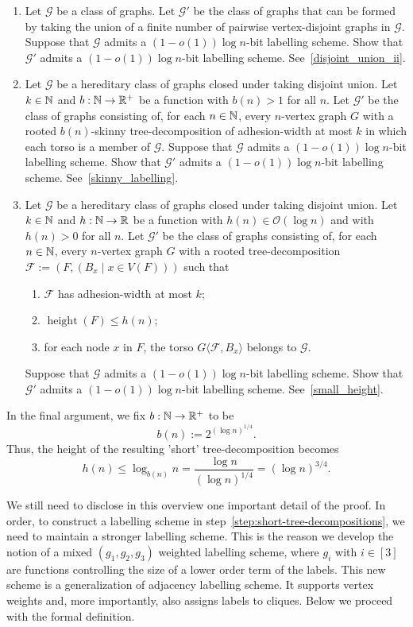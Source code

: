 \documentclass{patmorin}
\renewcommand{\le}{\leqslant}
\renewcommand{\leq}{\leqslant}
\newcommand{\torso}[2]{{#1}\langle{#2}\rangle}
\DeclareMathOperator{\height}{height}
\newcommand{\Oh}{\calO}
\newcommand{\calF}{\mathcal{F}}
\newcommand{\calG}{\mathcal{G}}
\newcommand{\calO}{\mathcal{O}}
\begin{document}
\begin{enumerate}[label=\rm(2\alph*)]
\item \label{step:union-closed}
Let $\calG$ be a class of graphs.
Let $\calG'$ be the class of graphs that can be formed by taking the union of a finite number of pairwise vertex-disjoint graphs in $\calG$.
    Suppose that $\calG$ admits a $(1-o(1))\log n$-bit labelling scheme.
    Show that $\calG'$ admits a $(1-o(1))\log n$-bit labelling scheme. See~\cref{disjoint_union_ii}.
\item \label{step:skinny-tree-decomposition}
Let $\calG$ be a hereditary class of graphs closed under taking disjoint union.
    Let $k\in\mathbb{N}$ and $b:\mathbb{N}\to\mathbb{R}^+$ be a function with $b(n)>1$ for all $n$.
    Let $\calG'$ be the class of graphs consisting of, for each $n\in\mathbb{N}$, every $n$-vertex graph $G$ with a rooted $b(n)$-skinny tree-decomposition of adhesion-width at most $k$ in which each torso is a member of $\calG$.
    Suppose that $\calG$ admits a $(1-o(1))\log n$-bit labelling scheme.
    Show that $\calG'$ admits a $(1-o(1))\log n$-bit labelling scheme. See~\cref{skinny_labelling}.
\item \label{step:short-tree-decompositions}
Let $\calG$ be a hereditary class of graphs closed under taking disjoint union. 
Let $k\in\mathbb{N}$ and  $h:\mathbb{N}\to\mathbb{R}$ be a function with $h(n)\in \Oh(\log n)$ and with $h(n)>0$ for all $n$. 
Let $\calG'$ be the class of graphs consisting of, for each $n\in\mathbb{N}$, every $n$-vertex graph $G$ with a rooted tree-decomposition $\calF:=(F,(B_x \mid x\in V(F)))$ such that
    \begin{enumerate}[nosep,nolistsep,label=(\rm{\roman*)}]
      \item $\calF$ has adhesion-width at most $k$;
      \item $\height(F)\le h(n)$;
      \item for each node $x$ in $F$, the torso $\torso{G}{\calF,B_x}$ belongs to $\calG$.
    \end{enumerate}
    Suppose that $\calG$ admits a $(1-o(1))\log n$-bit labelling scheme.
    Show that $\calG'$ admits a $(1-o(1))\log n$-bit labelling scheme. See~\cref{small_height}.
\end{enumerate}

In the final argument, we fix $b:\mathbb{N}\to\mathbb{R}^+$ to be 
\[
b(n):= 2^{(\log n)^{1/4}}.
\]
Thus, the height of the resulting 'short' tree-decomposition becomes
\[
h(n) \leq \log_{b(n)}n = \frac{\log n}{(\log n)^{1/4}} = (\log n)^{3/4}.
\]

We still need to disclose in this overview one important detail of the proof. In order, to construct a labelling scheme in step~\ref{step:short-tree-decompositions}, 
we need to maintain a stronger labelling scheme. 
This is the reason we develop the notion of a mixed $(g_1,g_2,g_3)$ weighted labelling scheme, where $g_i$ with $i\in[3]$ are functions controlling the size of a lower order term of the labels. 
This new scheme is a generalization of adjacency labelling scheme. 
It supports vertex weights and, more importantly, also assigns labels to cliques. Below we proceed with the formal definition. 
\end{document}
